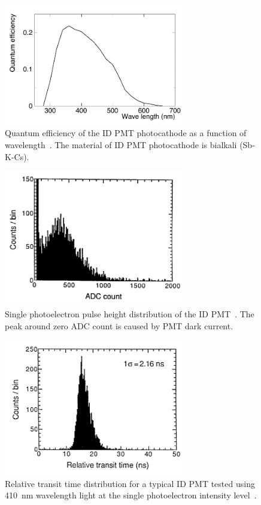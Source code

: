 \begin{figure}[H]
	\centering
	\includegraphics[width=8cm]{Figures/SK/IDPMTQE}
	\caption[Quantum efficiency of the ID PMT photocathode as a function of wavelength]{
	Quantum efficiency of the ID PMT photocathode as a function of wavelength~\cite{2003Fukuda}.
	The material of ID PMT photocathode is bialkali (Sb-K-Cs).
	}\label{SK_IDPMTQE}
\end{figure}

\begin{figure}[H]
	\centering
	\includegraphics[width=8cm]{Figures/SK/IDPMT1pe}
	\caption[Single photoelectron pulse height distribution of the ID PMT]{
	Single photoelectron pulse height distribution of the ID PMT~\cite{2003Fukuda}.
	The peak around zero ADC count is caused by PMT dark current.
	}\label{SK_IDPMT1pe}
\end{figure}

\begin{figure}[H]
	\centering
	\includegraphics[width=8cm]{Figures/SK/IDPMTt}
	\caption[Relative transit time distribution for a typical ID PMT tested using 410~nm wavelength light at the single photoelectron intensity level]{
	Relative transit time distribution for a typical ID PMT tested using 410~nm wavelength light at the single photoelectron intensity level~\cite{2003Fukuda}.
	}\label{SK_IDPMTt}
\end{figure}

